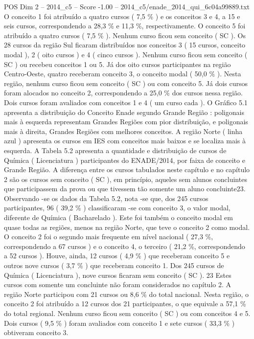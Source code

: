 \begin{textsample}{POS Dim 2 – 2014\_c5 – Score -1.00 – 2014\_c5/enade\_2014\_qui\_6c04a99889.txt}
O conceito 1 foi atribuído a quatro cursos ( 7,5 \% ) e os conceitos 3 e 4, a 15 e seis cursos, correspondendo a 28,3 \% e 11,3 \%, respectivamente.
O conceito 5 foi atribuído a quatro cursos ( 7,5 \% ).
Nenhum curso ficou sem conceito ( SC ).
Os 28 cursos da região Sul ficaram distribuídos nos conceitos 3 ( 15 cursos, conceito modal ), 2 ( oito cursos ) e 4 ( cinco cursos ).
Nenhum curso ficou sem conceito ( SC ) ou recebeu conceitos 1 ou 5.
Já dos oito cursos participantes na região Centro-Oeste, quatro receberam conceito 3, o conceito modal ( 50,0 \% ).
Nesta região, nenhum curso ficou sem conceito ( SC ) ou com conceito 5.
Já dois cursos foram alocados no conceito 2, correspondendo a 25,0 \% dos cursos nessa região.
Dois cursos foram avaliados com conceitos 1 e 4 ( um curso cada ).
O Gráfico 5.1 apresenta a distribuição do Conceito Enade segundo Grande Região : poligonais mais à esquerda representam Grandes Regiões com pior distribuição, e poligonais mais à direita, Grandes Regiões com melhores conceitos.
A região Norte ( linha azul ) apresenta os cursos em IES com conceitos mais baixos e se localiza mais à esquerda.
A Tabela 5.2 apresenta a quantidade e distribuição de cursos de Química ( Licenciatura ) participantes do ENADE/2014, por faixa de conceito e Grande Região.
A diferença entre os cursos tabulados neste capítulo e no capítulo 2 são os cursos sem conceito ( SC ), em princípio, aqueles sem alunos concluintes que participassem da prova ou que tivessem tão somente um aluno concluinte23.
Observando -se os dados da Tabela 5.2, nota -se que, dos 245 cursos participantes, 96 ( 39,2 \% ) classificaram -se com conceito 3, o valor modal, diferente de Química ( Bacharelado ).
Este foi também o conceito modal em quase todas as regiões, menos na região Norte, que teve o conceito 2 como modal.
O conceito 2 foi o segundo mais frequente em nível nacional ( 27,3 \%, correspondendo a 67 cursos ) e o conceito 4, o terceiro ( 21,2 \%, correspondendo a 52 cursos ).
Houve, ainda, 12 cursos ( 4,9 \% ) que receberam conceito 5 e outros nove cursos ( 3,7 \% ) que receberam conceito 1.
Dos 245 cursos de Química ( Licenciatura ), nove cursos ficaram sem conceito ( SC ). 23 Estes cursos com somente um concluinte não foram considerados no capítulo 2.
A região Norte participou com 21 cursos ou 8,6 \% do total nacional.
Nesta região, o conceito 2 foi atribuído a 12 cursos dos 21 participantes, o que equivale a 57,1 \% do total regional.
Nenhum curso ficou sem conceito ( SC ) ou com conceitos 4 e 5.
Dois cursos ( 9,5 \% ) foram avaliados com conceito 1 e sete cursos ( 33,3 \% ) obtiveram conceito 3.

\end{textsample}
